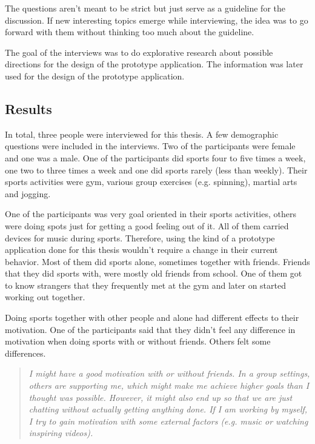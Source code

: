 The questions aren't meant to be strict but just serve as a guideline for the discussion. If new interesting topics emerge while interviewing, the idea was to go forward with them without thinking too much about the guideline.

The goal of the interviews was to do explorative research about possible directions for the design of the prototype application. The information was later used for the design of the prototype application.

\subsection{Results}

In total, three people were interviewed for this thesis. A few demographic questions were included in the interviews. Two of the participants were female and one was  a male. One of the participants did sports four to five times a week, one two to three times a week and one did sports rarely (less than weekly). Their sports activities were gym, various group exercises (e.g. spinning), martial arts and jogging.

One of the participants was very goal oriented in their sports activities, others were doing spots just for getting a good feeling out of it. All of them carried devices for music during sports. Therefore, using the kind of a prototype application done for this thesis wouldn't require a change in their current behavior. Most of them did sports alone, sometimes together with friends. Friends that they did sports with, were mostly old friends from school. One of them got to know strangers that they frequently met at the gym and later on started working out together.

Doing sports together with other people and alone had different effects to their motivation. One of the participants said that they didn't feel any difference in motivation when doing sports with or without friends. Others felt some differences.

\begin{quotation}
\it I might have a good motivation with or without friends. In a group settings, others are supporting me, which might make me achieve higher goals than I thought was possible. However, it might also end up so that we are just chatting without actually getting anything done. If I am working by myself, I try to gain motivation with some external factors (e.g. music or watching inspiring videos).
\end{quotation}

